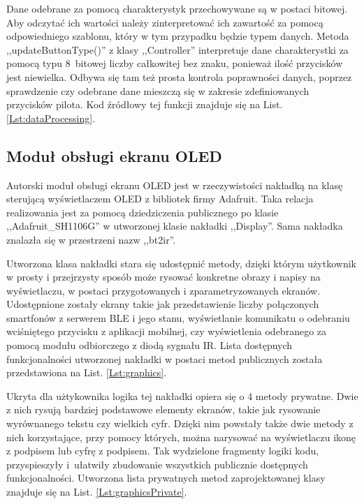 \documentclass[12pt,twoside]{article}
\begin{document}


Dane odebrane za pomocą charakterystyk przechowywane są w postaci bitowej. Aby odczytać ich wartości należy zinterpretować ich zawartość za pomocą odpowiedniego szablonu, który w tym przypadku będzie typem danych. Metoda ,,updateButtonType()'' z klasy ,,Controller'' interpretuje dane charakterystki za pomocą typu 8~bitowej liczby całkowitej bez znaku, ponieważ ilość przycisków jest niewielka. Odbywa się tam też prosta kontrola poprawności danych, poprzez sprawdzenie czy odebrane dane mieszczą się w zakresie zdefiniowanych przycisków pilota. Kod źródłowy tej funkcji znajduje się na List. \ref*{Lst:dataProcessing}.



\subsection{Moduł obsługi ekranu OLED}
Autorski moduł obsługi ekranu OLED jest w rzeczywistości nakładką na klasę sterującą wyświetlaczem OLED z bibliotek firmy Adafruit. Taka relacja realizowania jest za pomocą dziedziczenia publicznego po klasie ,,Adafruit\_SH1106G'' w utworzonej klasie nakładki ,,Display''. Sama nakładka znalazła się w przestrzeni nazw ,,bt2ir''.

Utworzona klasa nakładki stara się udostępnić metody, dzięki którym użytkownik w prosty i przejrzysty sposób może rysować konkretne obrazy i napisy na wyświetlaczu, w postaci przygotowanych i zparametryzowanych ekranów. Udostępnione zostały ekrany takie jak przedstawienie liczby połączonych smartfonów z serwerem BLE i jego stanu, wyświetlanie komunikatu o odebraniu wciśniętego przycisku z aplikacji mobilnej, czy wyświetlenia odebranego za pomocą modułu odbiorczego z diodą sygnału IR. Lista dostępnych funkcjonalności utworzonej nakładki w postaci metod publicznych została przedstawiona na List. \ref*{Lst:graphics}.



Ukryta dla użtykownika logika tej nakładki opiera się o 4 metody prywatne. Dwie z nich rysują bardziej podstawowe elementy ekranów, takie jak rysowanie wyrównanego tekstu czy wielkich cyfr. Dzięki nim powstały także dwie metody z nich korzystające, przy pomocy których, można narysować na wyświetlaczu ikonę z podpisem lub cyfrę z podpisem. Tak wydzielone fragmenty logiki kodu, przyspieszyły i~ułatwiły zbudowanie wszystkich publicznie dostępnych funkcjonalności. Utworzona lista prywatnych metod zaprojektowanej klasy znajduje się na List. \ref*{Lst:graphicsPrivate}.
\end{document}
